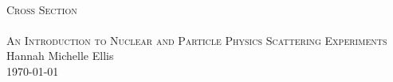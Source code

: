 \begin{titlepage}
\begin{center}
\HRule \\[0.5cm]
\textsc{\huge Cross Section}\\[0.5cm]
\HRule \\[0.5cm]
\textsc{\Large An Introduction to Nuclear and Particle Physics Scattering Experiments}\\[0.5cm]
\vfill
Hannah Michelle Ellis\\[1.0cm]
\today
\end{center}
\end{titlepage}
\thispagestyle{empty}
